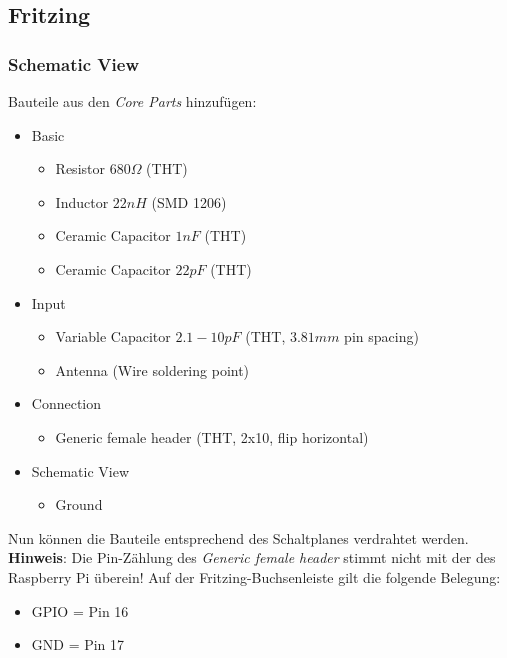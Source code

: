\subsection*{Fritzing}

\subsubsection{Schematic View}

Bauteile aus den \emph{Core Parts} hinzufügen:

\begin{itemize}
    \item  Basic
    \begin{itemize}
        \item Resistor $680 \Omega$ (THT)
        \item Inductor $22 nH$ (SMD 1206)
        \item Ceramic Capacitor $1 nF$ (THT)
        \item Ceramic Capacitor $22 pF$ (THT)
    \end{itemize}
    \item  Input
    \begin{itemize}
        \item Variable Capacitor $2.1-10 pF$ (THT, $3.81mm$ pin spacing)
        \item Antenna (Wire soldering point)
    \end{itemize}
    \item Connection
    \begin{itemize}
        \item Generic female header (THT, 2x10, flip horizontal)
    \end{itemize}
    \item Schematic View
    \begin{itemize}
        \item Ground
    \end{itemize}
\end{itemize}

Nun können die Bauteile entsprechend des Schaltplanes verdrahtet werden.
\textbf{Hinweis}: Die Pin-Zählung des \emph{Generic female header} stimmt nicht
mit der des Raspberry Pi überein! Auf der Fritzing-Buchsenleiste gilt die
folgende Belegung:

\begin{itemize}
    \item GPIO = Pin 16
    \item GND = Pin 17
\end{itemize}

